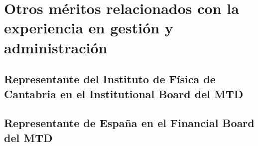 \documentclass[a4paper, 11pt, twoside, openright]{report}
\begin{document}
\section{Otros méritos relacionados con la experiencia en gestión y administración}

\subsection{Representante del Instituto de Física de Cantabria en el Institutional Board del MTD}


\subsection{Representante de España en el Financial Board del MTD}

\end{document}
